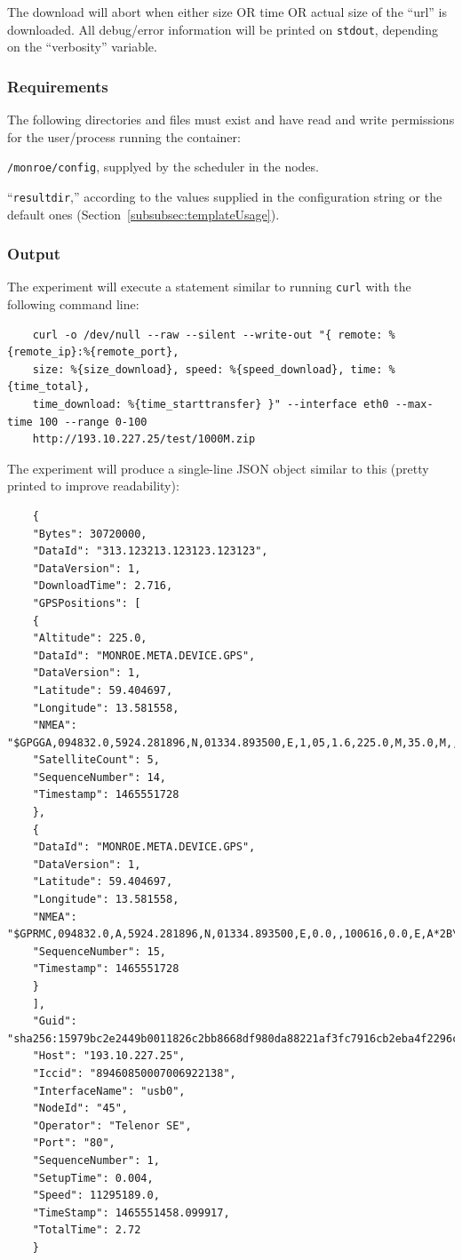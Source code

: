 \documentclass[a4paper,10pt]{article}
\newcommand{\VerbatimFont}{\footnotesize}
\newcommand{\identifier}[1]{{\texttt{\small{#1}}}}
\begin{document}
The download will abort when either size OR time OR actual size of the ``url'' is downloaded.
All debug/error information will be printed on \identifier{stdout}, depending on the ``verbosity'' variable.

\subsubsection{Requirements}

The following directories and files must exist and have read and write permissions for the user/process running the container:

\begin{itemize*}
	\item \identifier{/monroe/config}, supplyed by the scheduler in the nodes.
	\item ``\identifier{resultdir},'' according to the values supplied in the configuration string or the default ones (Section~\ref{subsubsec:templateUsage}).
\end{itemize*}

\subsubsection{Output}

The experiment will execute a statement similar to running \identifier{curl} with the following command line:

{\VerbatimFont
	\begin{verbatim}
	curl -o /dev/null --raw --silent --write-out "{ remote: %{remote_ip}:%{remote_port},
	size: %{size_download}, speed: %{speed_download}, time: %{time_total},
	time_download: %{time_starttransfer} }" --interface eth0 --max-time 100 --range 0-100
	http://193.10.227.25/test/1000M.zip
	\end{verbatim}}

The experiment will produce a single-line JSON object similar to this (pretty printed to improve readability):

{\VerbatimFont
	\begin{verbatim}
	{
	"Bytes": 30720000,
	"DataId": "313.123213.123123.123123",
	"DataVersion": 1,
	"DownloadTime": 2.716,
	"GPSPositions": [
	{
	"Altitude": 225.0,
	"DataId": "MONROE.META.DEVICE.GPS",
	"DataVersion": 1,
	"Latitude": 59.404697,
	"Longitude": 13.581558,
	"NMEA": "$GPGGA,094832.0,5924.281896,N,01334.893500,E,1,05,1.6,225.0,M,35.0,M,,*5D\r\n",
	"SatelliteCount": 5,
	"SequenceNumber": 14,
	"Timestamp": 1465551728
	},
	{
	"DataId": "MONROE.META.DEVICE.GPS",
	"DataVersion": 1,
	"Latitude": 59.404697,
	"Longitude": 13.581558,
	"NMEA": "$GPRMC,094832.0,A,5924.281896,N,01334.893500,E,0.0,,100616,0.0,E,A*2B\r\n",
	"SequenceNumber": 15,
	"Timestamp": 1465551728
	}
	],
	"Guid": "sha256:15979bc2e2449b0011826c2bb8668df980da88221af3fc7916cb2eba4f2296c1.0.45.15",
	"Host": "193.10.227.25",
	"Iccid": "89460850007006922138",
	"InterfaceName": "usb0",
	"NodeId": "45",
	"Operator": "Telenor SE",
	"Port": "80",
	"SequenceNumber": 1,
	"SetupTime": 0.004,
	"Speed": 11295189.0,
	"TimeStamp": 1465551458.099917,
	"TotalTime": 2.72
	}
	\end{verbatim}}
\end{document}
